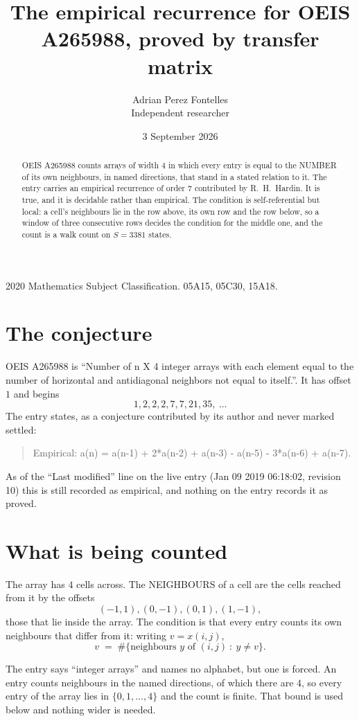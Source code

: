 \documentclass[11pt,a4paper]{article}
\title{The empirical recurrence for OEIS A265988, proved by transfer matrix}
\author{Adrian Perez Fontelles\\ \small Independent researcher}
\date{3 September 2026}
\theoremstyle{plain}
\theoremstyle{definition}
\begin{document}
\maketitle

\begin{abstract}
OEIS A265988 counts arrays of width $4$ in which every entry is equal to the NUMBER of its own
neighbours, in named directions, that stand in a stated relation to it. The entry carries an
empirical recurrence of order $7$ contributed by R.~H.~Hardin. It is true, and it is
decidable rather than empirical. The condition is self-referential but local: a cell's
neighbours lie in the row above, its own row and the row below, so a window of three
consecutive rows decides the condition for the middle one, and the count is a walk count on
$S=3381$ states.
\end{abstract}

\noindent\small 2020 Mathematics Subject Classification. 05A15, 05C30, 15A18.\normalsize

\section{The conjecture}

OEIS A265988 is ``Number of n X 4 integer arrays with each element equal to the number of horizontal and antidiagonal neighbors not equal to itself.''. It has offset $1$ and begins
\[
1, 2, 2, 2, 7, 7, 21, 35,\ \dots
\]
The entry states, as a conjecture contributed by its author and never marked settled:
\begin{quote}
Empirical: a(n) = a(n-1) + 2*a(n-2) + a(n-3) - a(n-5) - 3*a(n-6) + a(n-7).
\end{quote}
As of the ``Last modified'' line on the live entry (Jan 09 2019 06:18:02, revision 10) this is still
recorded as empirical, and nothing on the entry records it as proved.

\section{What is being counted}

The array has $4$ cells across. The NEIGHBOURS of a cell are the cells reached from it by the
offsets
\[
(-1,1), (0,-1), (0,1), (1,-1),
\]
those that lie inside the array. The condition is that every entry counts its own neighbours
that differ from it: writing $v=x(i,j)$,
\[
v\;=\;\#\{\text{neighbours } y \text{ of } (i,j)\ :\ y\ne v\} .
\]

The entry says ``integer arrays'' and names no alphabet, but one is forced. An entry counts
neighbours in the named directions, of which there are $4$, so every entry of the array
lies in $\{0,1,\dots,4\}$ and the count is finite. That bound is used below and
nothing wider is needed.
\end{document}
